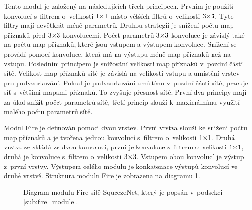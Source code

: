 Tento modul je založený na následujících třech principech.
Prvním je použití konvolucí s~filtrem o~velikosti $\sisetup{tight-spacing=true}1{\times}1$ místo větších filtrů o~velikosti $\sisetup{tight-spacing=true}3{\times}3$.
Tyto filtry mají devětkrát méně parametrů.
Druhou strategií je snížení počtu map příznaků před $\sisetup{tight-spacing=true}3{\times}3$ konvolucemi.
Počet parametrů $\sisetup{tight-spacing=true}3{\times}3$ konvoluce je závislý také na počtu map příznaků, které jsou vstupem a výstupem konvoluce.
Snížení se provádí pomocí konvoluce, která má na výstupu méně map příznaků než na vstupu.
Posledním principem je snižování velikosti map příznaků v~pozdní části sítě.
Velikost map příznaků sítě je závislá na velikosti vstupu a umístění vrstev pro podvzorkování.
Pokud je podvzorkování umístěno v~pozdní části sítě, pracuje síť s~většími mapami příznaků.
To zvyšuje přesnost sítě.
První dva principy mají za úkol snížit počet parametrů sítě, třetí princip slouží k~maximálnímu využití malého počtu parametrů sítě.

Modul Fire je definován pomocí dvou vrstev.
První vrstva slouží ke snížení počtu map příznaků a je tvořena jednou konvolucí s~filtrem o~velikosti $\sisetup{tight-spacing=true}1{\times}1$.
Druhá vrstva se skládá ze dvou konvolucí, první je konvoluce s~filtrem o~velikosti $\sisetup{tight-spacing=true}1{\times}1$, druhá je konvoluce s~filtrem o~velikosti $\sisetup{tight-spacing=true}3{\times}3$.
Vstupem obou konvolucí je výstup z~první vrstvy.
Výstupem celého modulu je konkatenace výstupů konvolucí ve druhé vrstvě.
Struktura modulu Fire je zobrazena na diagramu \ref{fig:fire}.

\begin{figure}
\centering
{}
\caption{Diagram modulu Fire sítě SqueezeNet, který je popsán v~podsekci \ref{sub:fire_module}.}
\label{fig:fire}
\end{figure}

